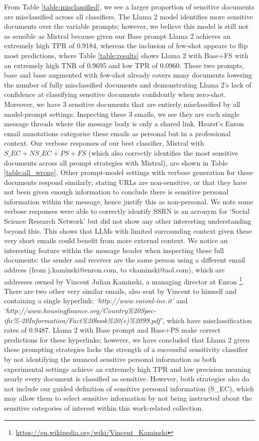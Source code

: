 From Table \ref{table:misclassified}, we see a larger proportion of sensitive documents are misclassified across all classifiers. The Llama 2 model identifies more sensitive documents over the variable prompts; however, we believe this model is still not as sensible as Mistral because given our Base prompt Llama 2 achieves an extremely high TPR of 0.9184, whereas the inclusion of few-shot appears to flip most predictions, where Table \ref{table:results} shows Llama 2 with Base+FS with an extremely high TNR of 0.9695 and low TPR of 0.0960. These two prompts, base and base augmented with few-shot already covers many documents lowering the number of fully misclassified documents and demonstrating Llama 2’s lack of confidence at classifying sensitive documents confidently when zero-shot. Moreover, we have 3 sensitive documents that are entirely misclassified by all model-prompt settings. Inspecting these 3 emails, we see they are each single message threads where the message body is only a shared link. Hearst’s Enron email annotations categorise these emails as personal but in a professional context. Our verbose responses of our best classifier, Mistral with $S\_EC+NS\_EC+PS+FS$ (which also correctly identifies the most sensitive documents across all prompt strategies with Mistral), are shown in Table \ref{table:all_wrong}. Other prompt-model settings with verbose generation for these documents respond similarly; stating URLs are non-sensitive, or that they have not been given enough information to conclude there is sensitive personal information within the message, hence justify this as non-personal. We note some verbose responses were able to correctly identify SSRN is an acronym for ‘Social Science Research Network’ but did not show any other interesting understanding beyond this. This shows that LLMs with limited surrounding context given these very short emails could benefit from more external context. We notice an interesting feature within the message header when inspecting these full documents: the sender and receiver are the same person using a different email address (from j.kaminski@enron.com, to vkaminski@aol.com), which are addresses owned by Vincent Julian Kaminski, a managing director at Enron \footnote{\url{https://en.wikipedia.org/wiki/Vincent_Kaminski}}. There are two other very similar emails, also sent by Vincent to himself and containing a single hyperlink: \textit{`http://www.vaionl-ine.it'} and \textit{`http://www.housingfinance.org/Country\%20Spec-ific\%-20Information/Fact\%20book\%20(e)\%2099.pdf'}, which have misclassification rates of 0.9487. Llama 2 with Base prompt and Base+PS make correct predictions for these hyperlinks; however, we have concluded that Llama 2 given these prompting strategies lacks the strength of a successful sensitivity classifier by not identifying the nuanced sensitive personal information as both experimental settings achieve an extremely high TPR and low precision meaning nearly every document is classified as sensitive. However, both strategies also do not include our guided definition of sensitive personal information (S\_EC), which may allow them to select sensitive information by not being instructed about the sensitive categories of interest within this work-related collection.

